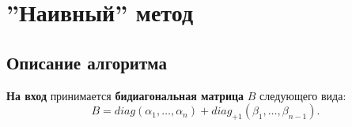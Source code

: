 



\newpage
\section{''Наивный'' метод}




\subsection{Описание алгоритма}
\textbf{На вход} принимается \textbf{бидиагональная матрица} \(B\) следующего вида:
\[
        B= diag(\alpha_1,\dots,\alpha_n)+diag_{+1}(\beta_1,\dots,\beta_{n-1}).
\]

